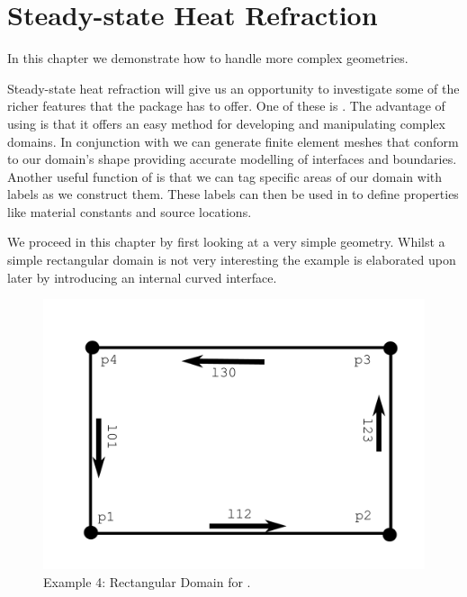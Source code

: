 
%
%
%

\section{Steady-state Heat Refraction}
\label{STEADY-STATE HEAT REFRACTION}

In this chapter we demonstrate how to handle more complex geometries. 

Steady-state heat refraction will give us an opportunity to investigate some of the richer features that the \esc package has to offer. One of these is \pycad . The advantage of using \pycad is that it offers an easy method for developing and manipulating complex domains. In conjunction with \gmsh we can generate finite element meshes that conform to our domain's shape providing accurate modelling of interfaces and boundaries. Another useful function of \pycad is that we can tag specific areas of our domain with labels as we construct them. These labels can then be used in \esc to define properties like material constants and source locations. 

We proceed in this chapter by first looking at a very simple geometry. Whilst a simple rectangular domain is not very interesting the example is elaborated upon later by introducing an internal curved interface.

\begin{figure}[ht]
\centerline{\includegraphics[width=4.in]{figures/pycadrec}}
\caption{Example 4: Rectangular Domain for \pycad.}
\label{fig:pycad rec}
\end{figure}

